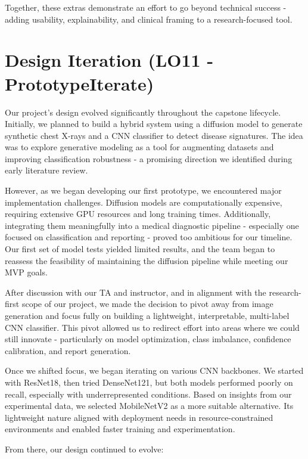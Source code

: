 \documentclass{article}
\begin{document}
Together, these extras demonstrate an effort to go beyond technical success - adding usability, explainability, and clinical framing to a research-focused tool.

\section{Design Iteration (LO11 - PrototypeIterate)}

Our project's design evolved significantly throughout the capstone lifecycle. Initially, we planned to build a hybrid system using a diffusion model to generate synthetic chest X-rays and a CNN classifier to detect disease signatures. The idea was to explore generative modeling as a tool for augmenting datasets and improving classification robustness - a promising direction we identified during early literature review.

However, as we began developing our first prototype, we encountered major implementation challenges. Diffusion models are computationally expensive, requiring extensive GPU resources and long training times. Additionally, integrating them meaningfully into a medical diagnostic pipeline - especially one focused on classification and reporting - proved too ambitious for our timeline. Our first set of model tests yielded limited results, and the team began to reassess the feasibility of maintaining the diffusion pipeline while meeting our MVP goals.

After discussion with our TA and instructor, and in alignment with the research-first scope of our project, we made the decision to pivot away from image generation and focus fully on building a lightweight, interpretable, multi-label CNN classifier. This pivot allowed us to redirect effort into areas where we could still innovate - particularly on model optimization, class imbalance, confidence calibration, and report generation.

Once we shifted focus, we began iterating on various CNN backbones. We started with ResNet18, then tried DenseNet121, but both models performed poorly on recall, especially with underrepresented conditions. Based on insights from our experimental data, we selected MobileNetV2 as a more suitable alternative. Its lightweight nature aligned with deployment needs in resource-constrained environments and enabled faster training and experimentation.

From there, our design continued to evolve:
\end{document}
